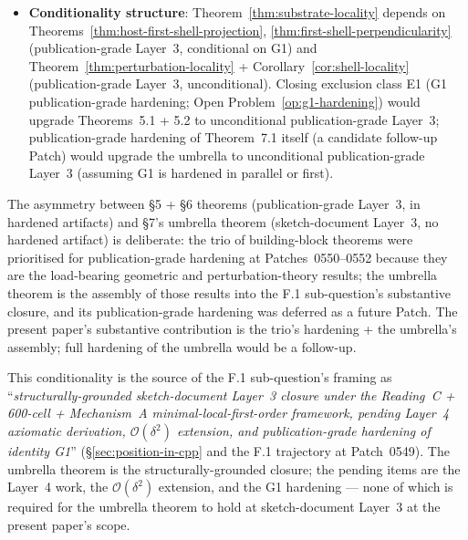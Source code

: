 \documentclass[11pt,letterpaper]{article}
\newcommand{\bigO}[1]{\mathcal{O}(#1)}
\begin{document}
\begin{itemize}[leftmargin=2em]
\item \textbf{Conditionality structure}: Theorem~\ref{thm:substrate-locality} depends on Theorems~\ref{thm:host-first-shell-projection}, \ref{thm:first-shell-perpendicularity} (publication-grade Layer~3, conditional on G1) and Theorem~\ref{thm:perturbation-locality} + Corollary~\ref{cor:shell-locality} (publication-grade Layer~3, unconditional). Closing exclusion class E1 (G1 publication-grade hardening; Open Problem~\ref{op:g1-hardening}) would upgrade Theorems~5.1 + 5.2 to unconditional publication-grade Layer~3; publication-grade hardening of Theorem~7.1 itself (a candidate follow-up Patch) would upgrade the umbrella to unconditional publication-grade Layer~3 (assuming G1 is hardened in parallel or first).
\end{itemize}

The asymmetry between §5 + §6 theorems (publication-grade Layer~3, in hardened artifacts) and §7's umbrella theorem (sketch-document Layer~3, no hardened artifact) is deliberate: the trio of building-block theorems were prioritised for publication-grade hardening at Patches~0550--0552 because they are the load-bearing geometric and perturbation-theory results; the umbrella theorem is the assembly of those results into the F.1 sub-question's substantive closure, and its publication-grade hardening was deferred as a future Patch. The present paper's substantive contribution is the trio's hardening + the umbrella's assembly; full hardening of the umbrella would be a follow-up.

This conditionality is the source of the F.1 sub-question's framing as ``\emph{structurally-grounded sketch-document Layer~3 closure under the Reading~C + 600-cell + Mechanism~A minimal-local-first-order framework, pending Layer~4 axiomatic derivation, $\bigO{\delta^2}$ extension, and publication-grade hardening of identity G1}'' (\S\ref{sec:position-in-cpp} and the F.1 trajectory at Patch~0549). The umbrella theorem is the structurally-grounded closure; the pending items are the Layer~4 work, the $\bigO{\delta^2}$ extension, and the G1 hardening — none of which is required for the umbrella theorem to hold at sketch-document Layer~3 at the present paper's scope.

\end{document}
